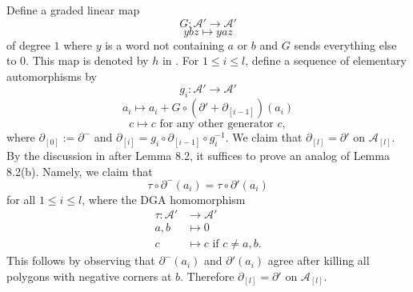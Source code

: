 \documentclass[11pt]{amsart}
\theoremstyle{mystyle}
\newcommand{\<}{\langle}
\renewcommand{\>}{\rangle}
\begin{document}
Define a graded linear map \[G: \mathcal{A}' \rightarrow \mathcal{A}'\] \[ybz \mapsto yaz\] of degree $1$ where $y$ is a word not containing $a$ or $b$ and $G$ sends everything else to $0$. This map is denoted by $h$ in \cite[Lem. 2.2]{chekanov2002dga}. For $1 \leq i \leq l$, define a sequence of elementary automorphisms by \[g_i: \mathcal{A}' \rightarrow \mathcal{A}'\] \[a_i \mapsto a_i + G \circ (\partial' + \partial_{[i-1]})(a_i)\] \[c \mapsto c \text{ for any other generator $c$},\] where $\partial_{[0]} := \partial^-$ and $\partial_{[i]} = g_i \circ \partial_{[i-1]} \circ g_i^{-1}$. We claim that $\partial_{[l]} = \partial'$ on $\mathcal{A}_{[l]}$. By the discussion in \cite{chekanov2002dga} after Lemma 8.2, it suffices to prove an analog of Lemma 8.2(b). Namely, we claim that \[\tau \circ \partial^-(a_i) = \tau \circ \partial'(a_i)\] for all $1 \leq i \leq l$, where the DGA homomorphism \begin{align*}
    \tau: \mathcal{A}' &\rightarrow \mathcal{A}' \\
    a, b &\mapsto 0 \\
    c &\mapsto c \text{ if $c \neq a, b$}.
\end{align*} This follows by observing that $\partial^-(a_i)$ and $\partial'(a_i)$ agree after killing all polygons with negative corners at $b$. Therefore $\partial_{[l]} = \partial'$ on $\mathcal{A}_{[l]}$.
\end{document}
